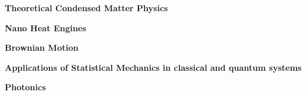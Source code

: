 

\begin{cventries}

  \cventry
    {} %
    {} %
    {} %
    {} %
    {
      \begin{cvitems} %
        \item {\textbf{Theoretical Condensed Matter Physics}}
        \item {\textbf{Nano Heat Engines}}
        \item {\textbf{Brownian Motion}}
        \item {\textbf{Applications of Statistical Mechanics in classical and quantum systems}}
        \item {\textbf{Photonics}}
      \end{cvitems}
    }

\end{cventries}
